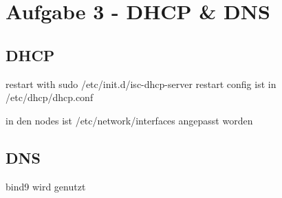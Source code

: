 \chapter{Aufgabe 3 - DHCP & DNS}
\section{DHCP}
restart with
sudo /etc/init.d/isc-dhcp-server restart
config ist in /etc/dhcp/dhcp.conf

in den nodes ist /etc/network/interfaces angepasst worden

\section{DNS}
bind9 wird genutzt

